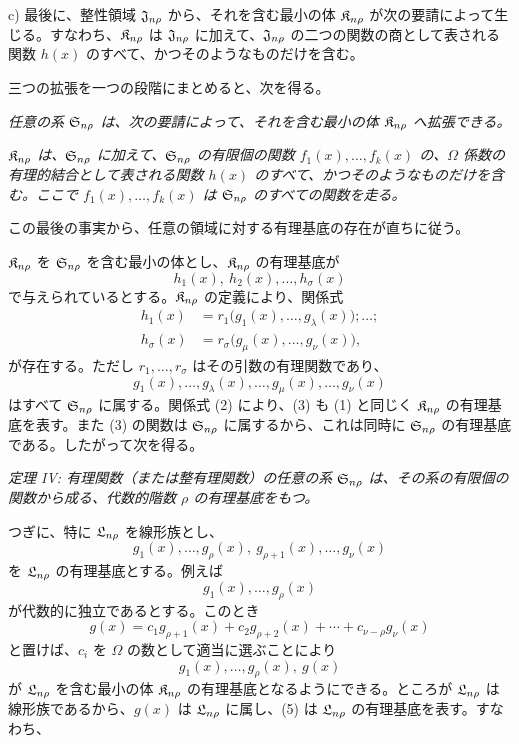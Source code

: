 \documentclass[11pt]{jlreq}
\begin{document}
c) 最後に、整性領域 $\mathfrak{J}_{n\rho}$ から、それを含む最小の体 $\mathfrak{K}_{n\rho}$ が次の要請によって生じる。すなわち、$\mathfrak{K}_{n\rho}$ は $\mathfrak{J}_{n\rho}$ に加えて、$\mathfrak{J}_{n\rho}$ の二つの関数の商として表される関数 $h(x)$ のすべて、かつそのようなものだけを含む。

三つの拡張を一つの段階にまとめると、次を得る。

\emph{任意の系 $\mathfrak{S}_{n\rho}$ は、次の要請によって、それを含む最小の体 $\mathfrak{K}_{n\rho}$ へ拡張できる。}

\emph{$\mathfrak{K}_{n\rho}$ は、$\mathfrak{S}_{n\rho}$ に加えて、$\mathfrak{S}_{n\rho}$ の有限個の関数 $f_1(x),\ldots,f_k(x)$ の、$\Omega$ 係数の有理的結合として表される関数 $h(x)$ のすべて、かつそのようなものだけを含む。ここで $f_1(x),\ldots,f_k(x)$ は $\mathfrak{S}_{n\rho}$ のすべての関数を走る。}

この最後の事実から、任意の領域に対する有理基底の存在が直ちに従う。

$\mathfrak{K}_{n\rho}$ を $\mathfrak{S}_{n\rho}$ を含む最小の体とし、$\mathfrak{K}_{n\rho}$ の有理基底が
\begin{equation}
  h_1(x),\ h_2(x),\ldots,h_\sigma(x)
\tag{1}
\end{equation}
で与えられているとする。$\mathfrak{K}_{n\rho}$ の定義により、関係式
\begin{equation}
\begin{aligned}
 h_1(x)&=r_1\bigl(g_1(x),\ldots,g_\lambda(x)\bigr);\ldots;\\
 h_\sigma(x)&=r_\sigma\bigl(g_\mu(x),\ldots,g_\nu(x)\bigr),
\end{aligned}
\tag{2}
\end{equation}
が存在する。ただし $r_1,\ldots,r_\sigma$ はその引数の有理関数であり、
\begin{equation}
  g_1(x),\ldots,g_\lambda(x),\ldots,
  g_\mu(x),\ldots,g_\nu(x)
\tag{3}
\end{equation}
はすべて $\mathfrak{S}_{n\rho}$ に属する。関係式 (2) により、(3) も (1) と同じく $\mathfrak{K}_{n\rho}$ の有理基底を表す。また (3) の関数は $\mathfrak{S}_{n\rho}$ に属するから、これは同時に $\mathfrak{S}_{n\rho}$ の有理基底である。したがって次を得る。

\emph{定理 IV: 有理関数（または整有理関数）の任意の系 $\mathfrak{S}_{n\rho}$ は、その系の有限個の関数から成る、代数的階数 $\rho$ の有理基底をもつ。}

つぎに、特に $\mathfrak{L}_{n\rho}$ を線形族とし、
\begin{equation}
  g_1(x),\ldots,g_\rho(x),\ g_{\rho+1}(x),\ldots,g_\nu(x)
\tag{4}
\end{equation}
を $\mathfrak{L}_{n\rho}$ の有理基底とする。例えば
\[
  g_1(x),\ldots,g_\rho(x)
\]
が代数的に独立であるとする。このとき
\[
  g(x)=c_1g_{\rho+1}(x)+c_2g_{\rho+2}(x)+\cdots+c_{\nu-\rho}g_\nu(x)
\]
と置けば、$c_i$ を $\Omega$ の数として適当に選ぶことにより
\begin{equation}
  g_1(x),\ldots,g_\rho(x),\ g(x)
\tag{5}
\end{equation}
が $\mathfrak{L}_{n\rho}$ を含む最小の体 $\mathfrak{K}_{n\rho}$ の有理基底となるようにできる。ところが $\mathfrak{L}_{n\rho}$ は線形族であるから、$g(x)$ は $\mathfrak{L}_{n\rho}$ に属し、(5) は $\mathfrak{L}_{n\rho}$ の有理基底を表す。すなわち、
\end{document}
